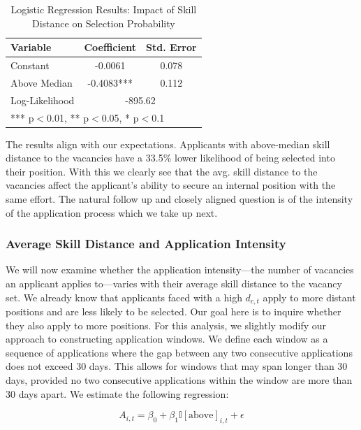 \documentclass[12pt]{article}
\begin{document}
\begin{table}[h]
\centering
\caption{Logistic Regression Results: Impact of Skill Distance on Selection Probability} 
\renewcommand{\arraystretch}{1.2} %
\begin{tabular}{lcc}
\hline
\textbf{Variable} & \textbf{Coefficient} & \textbf{Std. Error} \\
\hline
Constant & -0.0061 & 0.078 \\
Above Median & -0.4083*** & 0.112 \\
\hline
Log-Likelihood & \multicolumn{2}{c}{-895.62} \\
\hline
\multicolumn{3}{l}{\footnotesize{*** p$<$0.01, ** p$<$0.05, * p$<$0.1}} \\
\end{tabular}
\label{tab:selection_prob}
\end{table}

The results align with our expectations. Applicants with above-median skill distance to the vacancies have a 33.5\% lower likelihood of being selected into their position. With this we clearly see that the avg. skill distance to the vacancies affect the applicant's ability to secure an internal position with the same effort. The natural follow up and closely aligned question is of the intensity of the application process which we take up next.


\subsubsection{Average Skill Distance and Application Intensity}

We will now examine whether the application intensity—the number of vacancies an applicant applies to—varies with their average skill distance to the vacancy set. We already know that applicants faced with a high $d_{c,t}$ apply to more distant positions and are less likely to be selected. Our goal here is to inquire whether they also apply to more positions. For this analysis, we slightly modify our approach to constructing application windows. We define each window as a sequence of applications where the gap between any two consecutive applications does not exceed 30 days. This allows for windows that may span longer than 30 days, provided no two consecutive applications within the window are more than 30 days apart. We estimate the following regression:

\begin{equation}
    A_{i,t} = \beta_0 + \beta_1 \mathbb{I}[\text{above}]_{i,t} + \epsilon
\end{equation}
\end{document}
